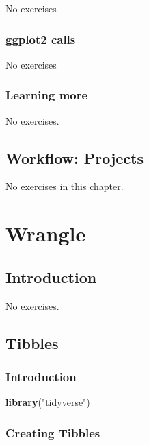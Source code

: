 \documentclass[]{book}
\newenvironment{Shaded}{\begin{snugshade}}{\end{snugshade}}
\newcommand{\KeywordTok}[1]{\textcolor[rgb]{0.13,0.29,0.53}{\textbf{#1}}}
\newcommand{\NormalTok}[1]{#1}
\newcommand{\StringTok}[1]{\textcolor[rgb]{0.31,0.60,0.02}{#1}}
\theoremstyle{plain}
\theoremstyle{remark}
\theoremstyle{definition}
\theoremstyle{definition}
\theoremstyle{definition}
\theoremstyle{remark}
\begin{document}
No exercises

\hypertarget{ggplot2-calls}{%
\section{ggplot2 calls}\label{ggplot2-calls}}

No exercises

\hypertarget{learning-more}{%
\section{Learning more}\label{learning-more}}

No exercises.

\hypertarget{workflow-projects}{%
\chapter{Workflow: Projects}\label{workflow-projects}}

No exercises in this chapter.

\hypertarget{part-wrangle}{%
\part{Wrangle}\label{part-wrangle}}

\hypertarget{introduction-4}{%
\chapter{Introduction}\label{introduction-4}}

No exercises.

\hypertarget{tibbles}{%
\chapter{Tibbles}\label{tibbles}}

\hypertarget{introduction-5}{%
\section{Introduction}\label{introduction-5}}

\begin{Shaded}
\begin{Highlighting}[]
\KeywordTok{library}\NormalTok{(}\StringTok{"tidyverse"}\NormalTok{)}
\end{Highlighting}
\end{Shaded}

\hypertarget{creating-tibbles}{%
\section{Creating Tibbles}\label{creating-tibbles}}
\end{document}
